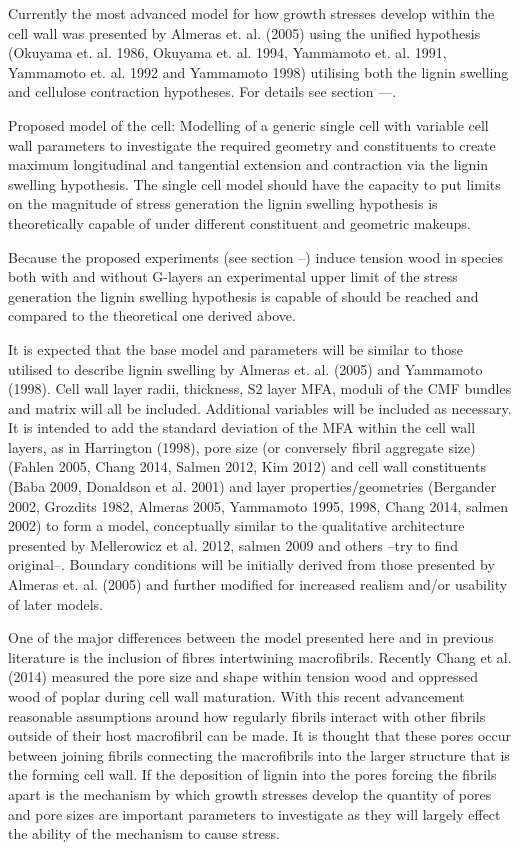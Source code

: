 \documentclass{article}
\begin{document}
Currently the most advanced model for how growth stresses develop within the
cell wall was presented by Almeras et. al. (2005) using the unified hypothesis
(Okuyama et. al. 1986, Okuyama et. al. 1994, Yammamoto et. al. 1991, Yammamoto
et. al. 1992 and Yammamoto 1998) utilising both the lignin swelling and
cellulose contraction hypotheses. For details see section ---.

Proposed model of the cell:
Modelling of a generic single cell with variable cell wall parameters to
investigate the required geometry and constituents to create maximum
longitudinal and tangential extension and contraction via the lignin swelling
hypothesis. The single cell model should have the capacity to put limits on the
magnitude of stress generation the lignin swelling hypothesis is theoretically
capable of under different constituent and geometric makeups.

Because the proposed experiments (see section --) induce tension wood in species
both with and without G-layers an experimental upper limit of the stress
generation the lignin swelling hypothesis is capable of should be reached and
compared to the theoretical one derived above.

It is expected that the base model and parameters will be similar to those
utilised to describe lignin swelling by Almeras  et. al. (2005) and Yammamoto
(1998). Cell wall layer radii, thickness, S2 layer MFA, moduli of the CMF
bundles and matrix will all be included. Additional variables will be included
as necessary. It is intended to add the standard deviation of the MFA within the
cell wall layers, as in Harrington (1998), pore size (or conversely fibril
aggregate size) (Fahlen 2005, Chang 2014, Salmen 2012, Kim 2012) and cell wall
constituents (Baba 2009, Donaldson et al. 2001) and layer properties/geometries
(Bergander 2002, Grozdits 1982, Almeras 2005, Yammamoto 1995, 1998, Chang 2014,
salmen 2002) to form a model, conceptually similar to the qualitative
architecture presented by Mellerowicz et al. 2012, salmen 2009 and others --try
to find original--. Boundary conditions will be initially derived from those
presented by Almeras et. al. (2005) and further modified for increased realism
and/or usability of later models.

One of the major differences between the model presented here and in previous
literature is the inclusion of fibres intertwining macrofibrils. Recently Chang
et al. (2014) measured the pore size and shape within tension wood and
oppressed wood of poplar during cell wall maturation. With this recent
advancement reasonable assumptions around how regularly fibrils interact with
other fibrils outside of their host macrofibril can be made. It is thought that
these pores occur between joining fibrils connecting the macrofibrils into
the larger structure that is the forming cell wall. If the deposition of lignin
into the pores forcing the fibrils apart is the mechanism by which growth
stresses develop the quantity of pores and pore sizes are important parameters
to investigate as they will largely effect the ability of the mechanism to cause
stress.
\end{document}
